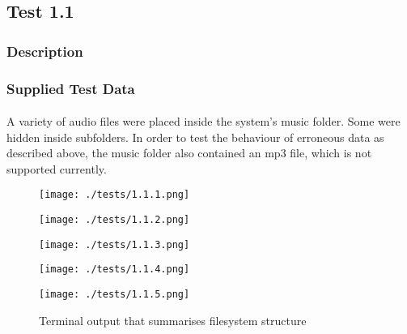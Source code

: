 \pagebreak
\subsection{Test 1.1}
\subsubsection*{Description}
\paragraph{}
{
	\centering
}

\subsubsection*{Supplied Test Data}
\paragraph{}
A variety of audio files were placed inside the system's music folder. Some were hidden inside subfolders. In order to test the behaviour of erroneous data as described above, the music folder also contained an mp3 file, which is not supported currently.

\begin{figure}[H]
	\texttt{[image: ./tests/1.1.1.png]}
\end{figure}
\begin{figure}[H]
	\texttt{[image: ./tests/1.1.2.png]}
\end{figure}
\begin{figure}[H]
	\texttt{[image: ./tests/1.1.3.png]}
\end{figure}
\begin{figure}[H]
	\texttt{[image: ./tests/1.1.4.png]}
\end{figure}
\begin{figure}[H]
	\texttt{[image: ./tests/1.1.5.png]}
	\caption{Terminal output that summarises filesystem structure}
\end{figure}

